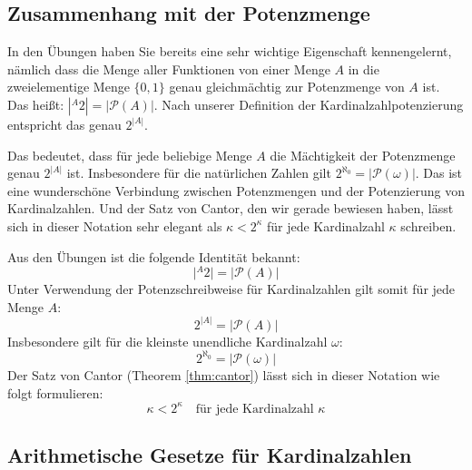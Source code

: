 \subsection{Zusammenhang mit der Potenzmenge}

\begin{spoken-clean}[01:16:39 - 01:18:55]
In den Übungen haben Sie bereits eine sehr wichtige Eigenschaft kennengelernt, nämlich dass die Menge aller Funktionen von einer Menge $A$ in die zweielementige Menge $\{0, 1\}$ genau gleichmächtig zur Potenzmenge von $A$ ist. Das heißt: $|{}^A 2| = |\mathcal{P}(A)|$. Nach unserer Definition der Kardinalzahlpotenzierung entspricht das genau $2^{|A|}$.

Das bedeutet, dass für jede beliebige Menge $A$ die Mächtigkeit der Potenzmenge genau $2^{|A|}$ ist. Insbesondere für die natürlichen Zahlen gilt $2^{\aleph_0} = |\mathcal{P}(\omega)|$. Das ist eine wunderschöne Verbindung zwischen Potenzmengen und der Potenzierung von Kardinalzahlen. Und der Satz von Cantor, den wir gerade bewiesen haben, lässt sich in dieser Notation sehr elegant als $\kappa < 2^\kappa$ für jede Kardinalzahl $\kappa$ schreiben.
\end{spoken-clean}

\begin{math-stroke}
Aus den Übungen ist die folgende Identität bekannt:
\[
\bigl| {}^{A}2 \bigr| = |\mathcal{P}(A)|
\]
Unter Verwendung der Potenzschreibweise für Kardinalzahlen gilt somit für jede Menge $A$:
\[
2^{|A|} = |\mathcal{P}(A)|
\]
Insbesondere gilt für die kleinste unendliche Kardinalzahl $\omega$:
\[
2^{\aleph_0} = |\mathcal{P}(\omega)|
\]
Der Satz von Cantor (Theorem \ref{thm:cantor}) lässt sich in dieser Notation wie folgt formulieren:
\begin{equation}\label{eq:cantor-arithmetic}
\kappa < 2^\kappa \quad \text{für jede Kardinalzahl } \kappa
\end{equation}
\end{math-stroke}

\subsection{Arithmetische Gesetze für Kardinalzahlen}

